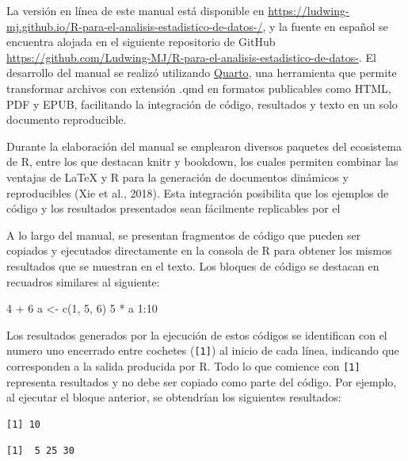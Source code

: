 \documentclass[
  spanish,
  letterpaper,
]{book}
\newenvironment{Shaded}{\begin{snugshade}}{\end{snugshade}}
\newcommand{\DecValTok}[1]{\textcolor[rgb]{0.68,0.00,0.00}{#1}}
\newcommand{\FunctionTok}[1]{\textcolor[rgb]{0.28,0.35,0.67}{#1}}
\newcommand{\NormalTok}[1]{\textcolor[rgb]{0.00,0.23,0.31}{#1}}
\newcommand{\OtherTok}[1]{\textcolor[rgb]{0.00,0.23,0.31}{#1}}
\newcommand{\SpecialCharTok}[1]{\textcolor[rgb]{0.37,0.37,0.37}{#1}}
\begin{document}

La versión en línea de este manual está disponible en
\url{https://ludwing-mj.github.io/R-para-el-analisis-estadistico-de-datos-/},
y la fuente en español se encuentra alojada en el siguiente repositorio
de GitHub
\url{https://github.com/Ludwing-MJ/R-para-el-analisis-estadistico-de-datos-}.
El desarrollo del manual se realizó utilizando
\href{https://quarto.org/}{Quarto}, una herramienta que permite
transformar archivos con extensión .qmd en formatos publicables como
HTML, PDF y EPUB, facilitando la integración de código, resultados y
texto en un solo documento reproducible.

Durante la elaboración del manual se emplearon diversos paquetes del
ecosistema de R, entre los que destacan knitr y bookdown, los cuales
permiten combinar las ventajas de LaTeX y R para la generación de
documentos dinámicos y reproducibles (Xie et al., 2018). Esta
integración posibilita que los ejemplos de código y los resultados
presentados sean fácilmente replicables por el

A lo largo del manual, se presentan fragmentos de código que pueden ser
copiados y ejecutados directamente en la consola de R para obtener los
mismos resultados que se muestran en el texto. Los bloques de código se
destacan en recuadros similares al siguiente:

\begin{Shaded}
\begin{Highlighting}[]
\DecValTok{4} \SpecialCharTok{+} \DecValTok{6}
\NormalTok{a }\OtherTok{\textless{}{-}} \FunctionTok{c}\NormalTok{(}\DecValTok{1}\NormalTok{, }\DecValTok{5}\NormalTok{, }\DecValTok{6}\NormalTok{)}
\DecValTok{5} \SpecialCharTok{*}\NormalTok{ a}
\DecValTok{1}\SpecialCharTok{:}\DecValTok{10}
\end{Highlighting}
\end{Shaded}

Los resultados generados por la ejecución de estos códigos se
identifican con el numero uno encerrado entre cochetes
(\texttt{{[}1{]}}) al inicio de cada línea, indicando que corresponden a
la salida producida por R. Todo lo que comience con \texttt{{[}1{]}}
representa resultados y no debe ser copiado como parte del código. Por
ejemplo, al ejecutar el bloque anterior, se obtendrían los siguientes
resultados:

\begin{verbatim}
[1] 10
\end{verbatim}

\begin{verbatim}
[1]  5 25 30
\end{verbatim}
\end{document}

